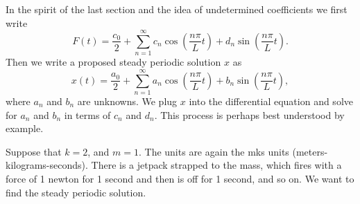 \documentclass{ximera}
\begin{document}
In the spirit of the last section and the idea of undetermined coefficients we first write
\begin{equation*}
    F(t) = \frac{c_0}{2} + \sum_{n=1}^\infty c_n \cos \left( \frac{n \pi}{L} t \right) + d_n \sin \left( \frac{n \pi}{L} t \right) .
\end{equation*}
Then we write a proposed steady periodic solution $x$ as
\begin{equation*}
    x(t) = \frac{a_0}{2} + \sum_{n=1}^\infty a_n \cos \left( \frac{n \pi}{L} t \right) + b_n \sin \left( \frac{n \pi}{L} t \right) ,
\end{equation*}
where $a_n$ and $b_n$ are unknowns. We plug $x$ into the differential equation and solve for $a_n$ and $b_n$ in terms of $c_n$ and $d_n$.  This process is perhaps best understood by example.


\begin{example} \label{afs:steadyex}
    Suppose that $k=2$, and $m=1$. The units are again the mks units (meters-kilograms-seconds). There is a jetpack strapped to the mass, which fires with a force of 1 newton for 1 second and then is off for 1 second, and so on.  We want to find the steady periodic solution.
\end{example}
\end{document}
